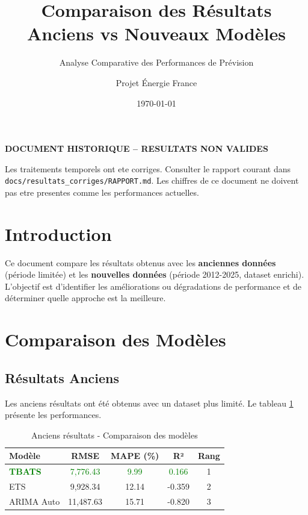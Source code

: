 \documentclass[12pt,a4paper]{article}
\title{\textbf{Comparaison des Résultats\\Anciens vs Nouveaux Modèles}}
\subtitle{Analyse Comparative des Performances de Prévision}
\author{Projet Énergie France}
\date{\today}
\begin{document}
\begin{center}\textbf{DOCUMENT HISTORIQUE -- RESULTATS NON VALIDES}\end{center}
Les traitements temporels ont ete corriges. Consulter le rapport courant dans \texttt{docs/resultats\_corriges/RAPPORT.md}. Les chiffres de ce document ne doivent pas etre presentes comme les performances actuelles.


\maketitle

\section{Introduction}

Ce document compare les résultats obtenus avec les \textbf{anciennes données} (période limitée) et les \textbf{nouvelles données} (période 2012-2025, dataset enrichi). L'objectif est d'identifier les améliorations ou dégradations de performance et de déterminer quelle approche est la meilleure.

\section{Comparaison des Modèles}

\subsection{Résultats Anciens}

Les anciens résultats ont été obtenus avec un dataset plus limité. Le tableau \ref{tab:anciens} présente les performances.

\begin{table}[h]
\centering
\caption{Anciens résultats - Comparaison des modèles}
\label{tab:anciens}
\begin{tabular}{lcccc}
\toprule
\textbf{Modèle} & \textbf{RMSE} & \textbf{MAPE (\%)} & \textbf{R²} & \textbf{Rang} \\
\midrule
\textcolor{green}{\textbf{TBATS}} & \textcolor{green}{7,776.43} & \textcolor{green}{9.99} & \textcolor{green}{0.166} & 1 \\
ETS & 9,928.34 & 12.14 & -0.359 & 2 \\
ARIMA Auto & 11,487.63 & 15.71 & -0.820 & 3 \\
\bottomrule
\end{tabular}
\end{table}
\end{document}
